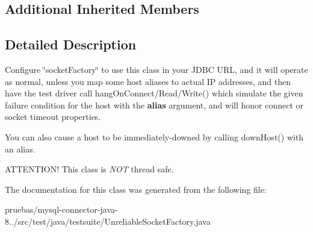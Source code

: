 \subsection*{Additional Inherited Members}


\subsection{Detailed Description}
Configure \char`\"{}socket\+Factory\char`\"{} to use this class in your J\+D\+BC U\+RL, and it will operate as normal, unless you map some host aliases to actual IP addresses, and then have the test driver call hang\+On\+Connect/\+Read/\+Write() which simulate the given failure condition for the host with the {\bfseries alias} argument, and will honor connect or socket timeout properties.

You can also cause a host to be immediately-\/downed by calling down\+Host() with an alias.

A\+T\+T\+E\+N\+T\+I\+O\+N! This class is {\itshape N\+OT} thread safe. 

The documentation for this class was generated from the following file\+:\begin{DoxyCompactItemize}
\item 
pruebas/mysql-\/connector-\/java-\/8../src/test/java/testsuite/Unreliable\+Socket\+Factory.\+java\end{DoxyCompactItemize}
